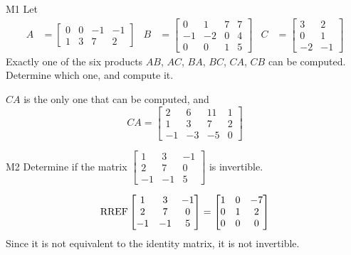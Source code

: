 \documentclass{sbgLAquiz}
\begin{document}
\begin{extract}\newpage\end{extract}
\begin{problem}{M1}
Let 
\begin{align*}
A &= \begin{bmatrix} 0 & 0 & -1 & -1 \\ 1 & 3 & 7 & 2 \end{bmatrix} & B &= \begin{bmatrix} 0 & 1 & 7 & 7 \\ -1 & -2 & 0 & 4 \\ 0 & 0 & 1 & 5 \end{bmatrix} & C&=\begin{bmatrix} 3 & 2 \\ 0 & 1 \\ -2 & -1 \end{bmatrix}
\end{align*}
Exactly one of the six products $AB$, $AC$, $BA$, $BC$, $CA$, $CB$ can be computed.  Determine which one, and compute it.
\end{problem}
\begin{solution}
$CA$ is the only one that can be computed, and 
$$CA = \begin{bmatrix} 2 & 6 & 11 & 1 \\ 1 & 3 & 7 & 2 \\ -1 & -3 & -5 & 0 \end{bmatrix}$$
\end{solution}



\begin{problem}{M2} Determine if the matrix $\begin{bmatrix} 1 & 3 & -1 \\ 2 & 7 & 0 \\ -1 & -1 & 5 \end{bmatrix}$ is invertible.
\end{problem}
\begin{solution}
$$\operatorname{RREF}\begin{bmatrix} 1 & 3 & -1 \\ 2 & 7 & 0 \\ -1 & -1 & 5 \end{bmatrix} =\begin{bmatrix} 1 & 0 & -7 \\ 0 & 1 & 2 \\ 0 & 0 & 0 \end{bmatrix}$$ 
Since it is not equivalent to the identity matrix, it is not invertible.
\end{solution}
\end{document}
